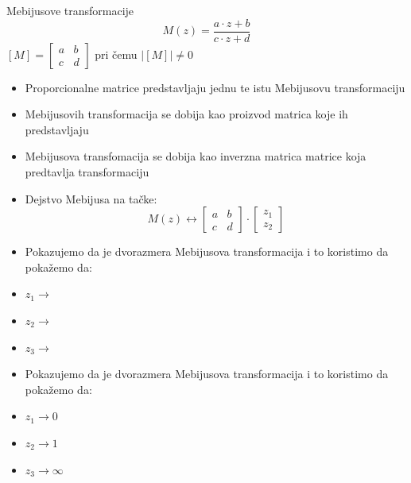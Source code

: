 \documentclass{beamer}
\begin{document}
\begin{frame}{Mebijusove transformacije}
$$M(z) = \frac{a\cdot z + b}{c\cdot z + d}$$
$[M] = \begin{bmatrix} 
a & b \\
c & d
\end{bmatrix}$ pri \v cemu $|[M]| \neq 0$
\begin{itemize}[<+->]
\item Proporcionalne matrice predstavljaju jednu te istu Mebijusovu 
transformaciju
\item {} Mebijusovih transformacija se dobija kao proizvod 
matrica koje ih predstavljaju
\item {} Mebijusova transfomacija se dobija kao inverzna 
matrica matrice koja predtavlja transformaciju
\item Dejstvo Mebijusa na ta\v cke:
      $$M(z) \longleftrightarrow \begin{bmatrix} a & b \\ c & d \end{bmatrix} 
\cdot \begin{bmatrix} z_1 \\ z_2 \end{bmatrix}$$
\end{itemize}
\end{frame}

\begin{frame}
\begin{itemize}
\item Pokazujemo da je dvorazmera Mebijusova transformacija i to 
koristimo da poka\v zemo da:
\item $z_1 \rightarrow$
\item $z_2 \rightarrow$
\item $z_3 \rightarrow$
\end{itemize}
\end{frame}

\begin{frame}
\begin{itemize}
\item Pokazujemo da je dvorazmera Mebijusova transformacija i to 
koristimo da poka\v zemo da:
\item $z_1 \rightarrow 0$
\item $z_2 \rightarrow 1$
\item $z_3 \rightarrow \infty$
\end{itemize}
\end{frame}
\end{document}
